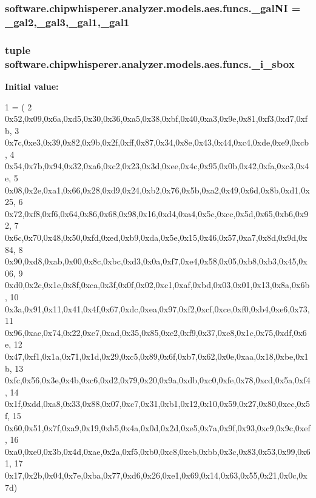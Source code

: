 \subsubsection[{\+\_\+gal\+N\+I}]{\setlength{\rightskip}{0pt plus 5cm}software.\+chipwhisperer.\+analyzer.\+models.\+aes.\+funcs.\+\_\+gal\+N\+I = {\bf \+\_\+gal2},{\bf \+\_\+gal3},{\bf \+\_\+gal1},{\bf \+\_\+gal1}}\label{namespacesoftware_1_1chipwhisperer_1_1analyzer_1_1models_1_1aes_1_1funcs_afb5deac4e15ab6b70483bc948d039c6a}
\hypertarget{namespacesoftware_1_1chipwhisperer_1_1analyzer_1_1models_1_1aes_1_1funcs_a8ba9c0ed1a40331b514551192ad6e1f7}{}
\subsubsection[{\+\_\+i\+\_\+sbox}]{\setlength{\rightskip}{0pt plus 5cm}tuple software.\+chipwhisperer.\+analyzer.\+models.\+aes.\+funcs.\+\_\+i\+\_\+sbox}\label{namespacesoftware_1_1chipwhisperer_1_1analyzer_1_1models_1_1aes_1_1funcs_a8ba9c0ed1a40331b514551192ad6e1f7}
{\bfseries Initial value\+:}
\begin{DoxyCode}
1 = (
2 0x52,0x09,0x6a,0xd5,0x30,0x36,0xa5,0x38,0xbf,0x40,0xa3,0x9e,0x81,0xf3,0xd7,0xfb,
3 0x7c,0xe3,0x39,0x82,0x9b,0x2f,0xff,0x87,0x34,0x8e,0x43,0x44,0xc4,0xde,0xe9,0xcb,
4 0x54,0x7b,0x94,0x32,0xa6,0xc2,0x23,0x3d,0xee,0x4c,0x95,0x0b,0x42,0xfa,0xc3,0x4e,
5 0x08,0x2e,0xa1,0x66,0x28,0xd9,0x24,0xb2,0x76,0x5b,0xa2,0x49,0x6d,0x8b,0xd1,0x25,
6 0x72,0xf8,0xf6,0x64,0x86,0x68,0x98,0x16,0xd4,0xa4,0x5c,0xcc,0x5d,0x65,0xb6,0x92,
7 0x6c,0x70,0x48,0x50,0xfd,0xed,0xb9,0xda,0x5e,0x15,0x46,0x57,0xa7,0x8d,0x9d,0x84,
8 0x90,0xd8,0xab,0x00,0x8c,0xbc,0xd3,0x0a,0xf7,0xe4,0x58,0x05,0xb8,0xb3,0x45,0x06,
9 0xd0,0x2c,0x1e,0x8f,0xca,0x3f,0x0f,0x02,0xc1,0xaf,0xbd,0x03,0x01,0x13,0x8a,0x6b,
10 0x3a,0x91,0x11,0x41,0x4f,0x67,0xdc,0xea,0x97,0xf2,0xcf,0xce,0xf0,0xb4,0xe6,0x73,
11 0x96,0xac,0x74,0x22,0xe7,0xad,0x35,0x85,0xe2,0xf9,0x37,0xe8,0x1c,0x75,0xdf,0x6e,
12 0x47,0xf1,0x1a,0x71,0x1d,0x29,0xc5,0x89,0x6f,0xb7,0x62,0x0e,0xaa,0x18,0xbe,0x1b,
13 0xfc,0x56,0x3e,0x4b,0xc6,0xd2,0x79,0x20,0x9a,0xdb,0xc0,0xfe,0x78,0xcd,0x5a,0xf4,
14 0x1f,0xdd,0xa8,0x33,0x88,0x07,0xc7,0x31,0xb1,0x12,0x10,0x59,0x27,0x80,0xec,0x5f,
15 0x60,0x51,0x7f,0xa9,0x19,0xb5,0x4a,0x0d,0x2d,0xe5,0x7a,0x9f,0x93,0xc9,0x9c,0xef,
16 0xa0,0xe0,0x3b,0x4d,0xae,0x2a,0xf5,0xb0,0xc8,0xeb,0xbb,0x3c,0x83,0x53,0x99,0x61,
17 0x17,0x2b,0x04,0x7e,0xba,0x77,0xd6,0x26,0xe1,0x69,0x14,0x63,0x55,0x21,0x0c,0x7d)
\end{DoxyCode}
\hypertarget{namespacesoftware_1_1chipwhisperer_1_1analyzer_1_1models_1_1aes_1_1funcs_a10ce65402519f249cdb42f3a22b50d14}{}
